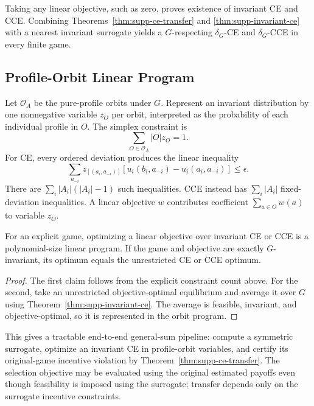 Taking any linear objective, such as zero, proves existence of invariant CE and CCE.  Combining Theorems~\ref{thm:supp-ce-transfer} and
\ref{thm:supp-invariant-ce} with a nearest invariant surrogate yields a $G$-respecting $\delta_G$-CE and $\delta_G$-CCE in every finite game.

\subsection{Profile-Orbit Linear Program}

Let $\mathcal O_A$ be the pure-profile orbits under $G$.  Represent an invariant distribution by one nonnegative variable $z_O$ per orbit, interpreted as the probability of each individual profile in $O$.  The simplex constraint is
\begin{equation}
\sum_{O\in\mathcal O_A}|O|z_O=1.
\label{eq:supp-orbit-simplex}
\end{equation}
For CE, every ordered deviation produces the linear inequality
\[
\sum_{a_{-i}}
 z_{[(a_i,a_{-i})]}
[u_i(b_i,a_{-i})-u_i(a_i,a_{-i})]
\le\epsilon.
\]
There are $\sum_i|A_i|(|A_i|-1)$ such inequalities.  CCE instead has $\sum_i|A_i|$ fixed-deviation inequalities.  A linear objective $w$ contributes coefficient
$\sum_{a\in O}w(a)$ to variable $z_O$.

\begin{proposition}
\label{prop:supp-orbit-ce}
For an explicit game, optimizing a linear objective over invariant CE or CCE is a polynomial-size linear program.  If the game and objective are exactly $G$-invariant, its optimum equals the unrestricted CE or CCE optimum.
\end{proposition}
\begin{proof}
The first claim follows from the explicit constraint count above.  For the second, take an unrestricted objective-optimal equilibrium and average it over $G$ using Theorem~\ref{thm:supp-invariant-ce}.  The average is feasible, invariant, and objective-optimal, so it is represented in the orbit program.
\end{proof}

This gives a tractable end-to-end general-sum pipeline: compute a symmetric surrogate, optimize an invariant CE in profile-orbit variables, and certify its original-game incentive violation by Theorem~\ref{thm:supp-ce-transfer}.  The selection objective may be evaluated using the original estimated payoffs even though feasibility is imposed using the surrogate; transfer depends only on the surrogate incentive constraints.

